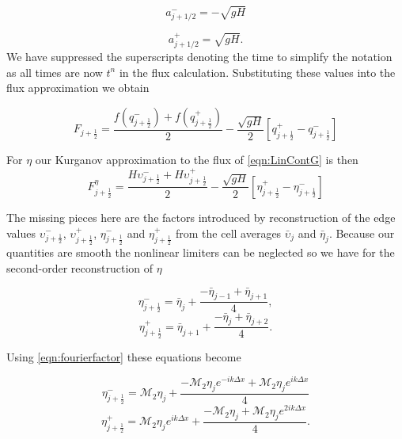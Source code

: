 \[a^-_{j+ 1/2} =  - \sqrt{g H}\]

\[a^+_{j+ 1/2} = \sqrt{g H}.\]
We have suppressed the superscripts denoting the time to simplify the notation as all times are now $t^n$ in the flux calculation. Substituting these values into the flux approximation we obtain 

\begin{equation}\label{eqn:HLL_fluxred}
F_{j+\frac{1}{2}} = \dfrac{ f\left(q^-_{j+\frac{1}{2}}\right) + f\left(q^+_{j+\frac{1}{2}}\right)}{ 2}  - \dfrac{ \sqrt{gH}}{ 2} \left [ q^+_{j+\frac{1}{2}} - q^-_{j+\frac{1}{2}} \right ]
\end{equation}

For $\eta$ our Kurganov approximation to the flux of \eqref{eqn:LinContG} is then
\begin{equation}
\label{eqn:HLL_fluxeta}
F^{\eta}_{j+\frac{1}{2}} = \dfrac{ H \upsilon ^-_{j+\frac{1}{2}}+ H \upsilon ^+_{j+\frac{1}{2}}}{ 2}  - \dfrac{ \sqrt{gH}}{ 2} \left [ \eta^+_{j+\frac{1}{2}} - \eta^-_{j+\frac{1}{2}} \right ]
\end{equation}

The missing pieces here are the factors introduced by reconstruction of the edge values $\upsilon ^-_{j+\frac{1}{2}}$, $\upsilon ^+_{j+\frac{1}{2}}$, $\eta ^-_{j+\frac{1}{2}}$ and $\eta ^+_{j+\frac{1}{2}}$ from the cell averages $\bar{\upsilon}_j$ and $\bar{\eta}_j$. Because our quantities are smooth the nonlinear limiters can be neglected so we have for the second-order reconstruction of $\eta$ 

\begin{equation*}
\eta^-_{j+\frac{1}{2}} = \bar{\eta}_j + \frac{- \bar{\eta}_{j - 1} + \bar{\eta}_{j+ 1} }{4},
\end{equation*}
\begin{equation*}
\eta^+_{j+\frac{1}{2}} = \bar{\eta}_{j+1} + \frac{- \bar{\eta}_{j} + \bar{\eta}_{j+ 2}}{4}.
\end{equation*}
	
Using \eqref{eqn:fourierfactor} these equations become


\begin{equation*}
\eta^-_{j+\frac{1}{2}} = \mathcal{M}_2{\eta}_j + \frac{- \mathcal{M}_2{\eta}_{j} e^{-ik\Delta x} + \mathcal{M}_2{\eta}_{j} e^{ik\Delta x}}{4}
\end{equation*}
\begin{equation*}
\eta^+_{j+\frac{1}{2}} = \mathcal{M}_2{\eta}_{j}e^{ik\Delta x} + \frac{- \mathcal{M}_2{\eta}_{j} + \mathcal{M}_2{\eta}_{j}e^{2ik\Delta x} }{4}.
\end{equation*}


